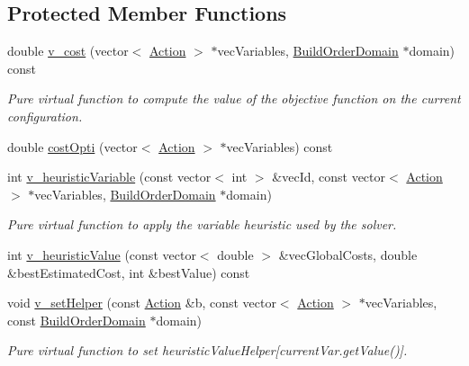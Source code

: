 \subsection*{Protected Member Functions}
\begin{DoxyCompactItemize}
\item 
double \hyperlink{classghost_1_1BuildOrderObjective_a65a1e23654ddb00ff575c628cf982bef}{v\-\_\-cost} (vector$<$ \hyperlink{classghost_1_1Action}{Action} $>$ $\ast$vec\-Variables, \hyperlink{classghost_1_1BuildOrderDomain}{Build\-Order\-Domain} $\ast$domain) const 
\begin{DoxyCompactList}\small\item\em Pure virtual function to compute the value of the objective function on the current configuration. \end{DoxyCompactList}\item 
double \hyperlink{classghost_1_1BuildOrderObjective_aa1783d6d3ae2550905a961e6fcc37a86}{cost\-Opti} (vector$<$ \hyperlink{classghost_1_1Action}{Action} $>$ $\ast$vec\-Variables) const 
\item 
int \hyperlink{classghost_1_1BuildOrderObjective_a3704745355d6bf12a3afe2e8d551f38a}{v\-\_\-heuristic\-Variable} (const vector$<$ int $>$ \&vec\-Id, const vector$<$ \hyperlink{classghost_1_1Action}{Action} $>$ $\ast$vec\-Variables, \hyperlink{classghost_1_1BuildOrderDomain}{Build\-Order\-Domain} $\ast$domain)
\begin{DoxyCompactList}\small\item\em Pure virtual function to apply the variable heuristic used by the solver. \end{DoxyCompactList}\item 
int \hyperlink{classghost_1_1BuildOrderObjective_a3018e45b565e872b39865fcf2a5ed626}{v\-\_\-heuristic\-Value} (const vector$<$ double $>$ \&vec\-Global\-Costs, double \&best\-Estimated\-Cost, int \&best\-Value) const 
\item 
void \hyperlink{classghost_1_1BuildOrderObjective_ad76dc815275350590eb67db1d22cc02b}{v\-\_\-set\-Helper} (const \hyperlink{classghost_1_1Action}{Action} \&b, const vector$<$ \hyperlink{classghost_1_1Action}{Action} $>$ $\ast$vec\-Variables, const \hyperlink{classghost_1_1BuildOrderDomain}{Build\-Order\-Domain} $\ast$domain)
\begin{DoxyCompactList}\small\item\em Pure virtual function to set heuristic\-Value\-Helper\mbox{[}current\-Var.\-get\-Value()\mbox{]}. \end{DoxyCompactList}\item 

\end{DoxyCompactItemize}
